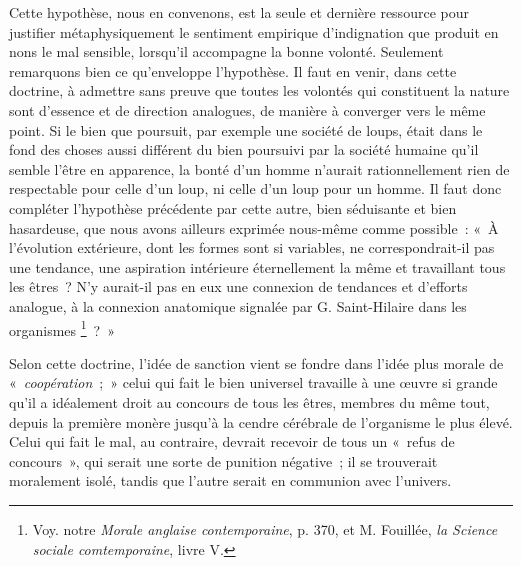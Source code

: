 \documentclass[french,twoside]{book} %
\begin{document}
Cette hypothèse, nous en convenons, est la seule et dernière ressource pour justifier métaphysiquement le sentiment empirique d’indignation que produit en nons le mal sensible, lorsqu’il accompagne la bonne volonté. Seulement remarquons bien ce qu’enveloppe l’hypothèse. Il faut en venir, dans cette doctrine, à admettre sans preuve que toutes les volontés qui constituent la nature sont d’essence et de direction analogues, de manière à converger vers le même point. Si le bien que poursuit, par exemple une société de loups, était dans le fond des choses aussi différent du bien poursuivi par la société humaine qu’il semble l’être en apparence, la bonté d’un homme n’aurait rationnellement rien de respectable pour celle d’un loup, ni celle d’un loup pour un homme. Il faut donc compléter l’hypothèse précédente par cette autre, bien séduisante et bien hasardeuse, que nous avons ailleurs exprimée nous-même comme possible : « À l’évolution extérieure, dont les formes sont si variables, ne correspondrait-il pas une tendance, une aspiration intérieure éternellement la même et travaillant tous les êtres ? N’y aurait-il pas en eux une connexion de tendances et d’efforts analogue, à la connexion anatomique signalée par G. Saint-Hilaire dans les organismes \footnote{Voy. notre \emph{Morale anglaise contemporaine}, p. 370, et M. Fouillée, \emph{la Science sociale comtemporaine}, livre V.} ? »\par
Selon cette doctrine, l’idée de sanction vient se fondre dans l’idée plus morale de « \emph{coopération} ; » celui qui fait le bien universel travaille à une œuvre si grande qu’il a idéalement droit au concours de tous les êtres, membres du même tout, depuis la première monère jusqu’à la cendre cérébrale de l’organisme le plus élevé. Celui qui fait le mal, au contraire, devrait recevoir de tous un « refus de concours », qui serait une sorte de punition négative ; il se trouverait moralement isolé, tandis que l’autre serait en communion avec l’univers.\par
\end{document}
